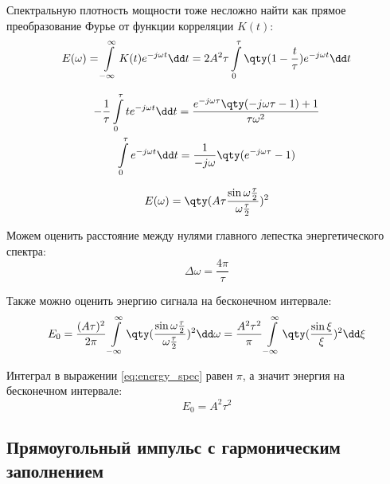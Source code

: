 Спектральную плотность мощности тоже несложно найти как прямое преобразование
Фурье от функции корреляции $K(t)$:
\begin{equation}
    \begin{gathered}
        E(\omega) = \int\limits_{-\infty}^{\infty} K(t) e^{-j\omega t} \dd t =
        2 A^2 \tau \int\limits_{0}^{\tau}  \qty(1- \frac{t}{\tau} )e^{-j \omega t}\dd t
    \end{gathered}
\end{equation}

\begin{equation}
    \begin{gathered}
        - \frac{1}{\tau}\int\limits_{0}^{\tau}  t e^{-j \omega t}\dd t = 
        \frac{e^{- j \omega \tau} \qty( - j \omega \tau - 1) + 1}{\tau\omega^2}
        \\
        \int\limits_{0}^{\tau}  e^{-j \omega t}\dd t = 
        \frac{1}{-j \omega} \qty(e^{-j\omega\tau} - 1)
    \end{gathered}
\end{equation}





\begin{equation}
    \label{eq:pdf}
    E(\omega) = \qty(A\tau \sinc{\omega \frac{\tau}{2}})^2
\end{equation}

Можем оценить расстояние между нулями главного лепестка энергетического спектра:
\begin{equation}
    \label{eq:DeltaW}
    \Delta \omega = \frac{4 \pi}{\tau}
\end{equation}


Также можно оценить энергию сигнала на бесконечном интервале:
 \begin{equation}
     \label{eq:energy_spec}
     E_0 = \frac{(A \tau)^2}{2\pi}
     \int\limits_{-\infty}^{\infty} \qty(\sinc{\omega \frac{\tau}{2}})^2 \dd
     \omega  = \frac{A^2 \tau^2}{\pi} \int\limits_{-\infty}^{\infty}
     \qty(\sinc{\xi})^2 \dd \xi 
\end{equation}



Интеграл в выражении \eqref{eq:energy_spec} равен $\pi$, а значит энергия на
бесконечном интервале: 
 \begin{equation}
     E_0 = A^2 \tau^2
\end{equation}


\subsection{Прямоугольный импульс с гармоническим заполнением}%
\label{sub:priamougol_nyi_impul_s_s_garmonicheskim_zapolneniem}


